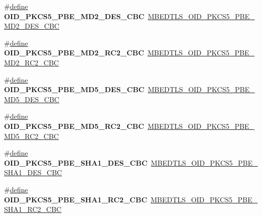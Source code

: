 \begin{DoxyCompactItemize}
\item 
\mbox{\label{compat-1_83_8h_aa74a6e95d538e8a1c3380ce0be60bf58}} 
\#\hyperlink{structdefine}{define} {\bfseries O\+I\+D\+\_\+\+P\+K\+C\+S5\+\_\+\+P\+B\+E\+\_\+\+M\+D2\+\_\+\+D\+E\+S\+\_\+\+C\+BC}~\hyperlink{oid_8h_aee89ea0c0a0b7e9638df339d5a4ed27a}{M\+B\+E\+D\+T\+L\+S\+\_\+\+O\+I\+D\+\_\+\+P\+K\+C\+S5\+\_\+\+P\+B\+E\+\_\+\+M\+D2\+\_\+\+D\+E\+S\+\_\+\+C\+BC}
\item 
\mbox{\label{compat-1_83_8h_a95facbdf4d03aa580defa390221f6f32}} 
\#\hyperlink{structdefine}{define} {\bfseries O\+I\+D\+\_\+\+P\+K\+C\+S5\+\_\+\+P\+B\+E\+\_\+\+M\+D2\+\_\+\+R\+C2\+\_\+\+C\+BC}~\hyperlink{oid_8h_a64ee777837203609ebde78bd66e82e84}{M\+B\+E\+D\+T\+L\+S\+\_\+\+O\+I\+D\+\_\+\+P\+K\+C\+S5\+\_\+\+P\+B\+E\+\_\+\+M\+D2\+\_\+\+R\+C2\+\_\+\+C\+BC}
\item 
\mbox{\label{compat-1_83_8h_a50cec8b7e2f8c36335ade6c486299cf1}} 
\#\hyperlink{structdefine}{define} {\bfseries O\+I\+D\+\_\+\+P\+K\+C\+S5\+\_\+\+P\+B\+E\+\_\+\+M\+D5\+\_\+\+D\+E\+S\+\_\+\+C\+BC}~\hyperlink{oid_8h_ab9cd0427ee90eb79955efa41fb44534e}{M\+B\+E\+D\+T\+L\+S\+\_\+\+O\+I\+D\+\_\+\+P\+K\+C\+S5\+\_\+\+P\+B\+E\+\_\+\+M\+D5\+\_\+\+D\+E\+S\+\_\+\+C\+BC}
\item 
\mbox{\label{compat-1_83_8h_aa0b452da4998a72f4fbc05a6e014f23d}} 
\#\hyperlink{structdefine}{define} {\bfseries O\+I\+D\+\_\+\+P\+K\+C\+S5\+\_\+\+P\+B\+E\+\_\+\+M\+D5\+\_\+\+R\+C2\+\_\+\+C\+BC}~\hyperlink{oid_8h_ad6a00394222f6c6312802768c2c27ca9}{M\+B\+E\+D\+T\+L\+S\+\_\+\+O\+I\+D\+\_\+\+P\+K\+C\+S5\+\_\+\+P\+B\+E\+\_\+\+M\+D5\+\_\+\+R\+C2\+\_\+\+C\+BC}
\item 
\mbox{\label{compat-1_83_8h_aa00562c1aafd2fb9a7efe1802613f0cc}} 
\#\hyperlink{structdefine}{define} {\bfseries O\+I\+D\+\_\+\+P\+K\+C\+S5\+\_\+\+P\+B\+E\+\_\+\+S\+H\+A1\+\_\+\+D\+E\+S\+\_\+\+C\+BC}~\hyperlink{oid_8h_a03134831a88ea1a585774a9caec44104}{M\+B\+E\+D\+T\+L\+S\+\_\+\+O\+I\+D\+\_\+\+P\+K\+C\+S5\+\_\+\+P\+B\+E\+\_\+\+S\+H\+A1\+\_\+\+D\+E\+S\+\_\+\+C\+BC}
\item 
\mbox{\label{compat-1_83_8h_aad68d78cf22449efab4205c75a5a5d3b}} 
\#\hyperlink{structdefine}{define} {\bfseries O\+I\+D\+\_\+\+P\+K\+C\+S5\+\_\+\+P\+B\+E\+\_\+\+S\+H\+A1\+\_\+\+R\+C2\+\_\+\+C\+BC}~\hyperlink{oid_8h_a40e3bd9eca60a7f7eda16578af8a1df2}{M\+B\+E\+D\+T\+L\+S\+\_\+\+O\+I\+D\+\_\+\+P\+K\+C\+S5\+\_\+\+P\+B\+E\+\_\+\+S\+H\+A1\+\_\+\+R\+C2\+\_\+\+C\+BC}

\end{DoxyCompactItemize}
